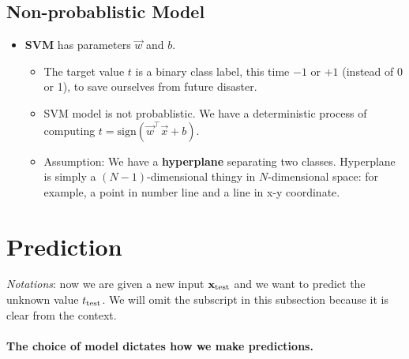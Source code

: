 \documentclass{discussion}
\providecommand{\tightlist}{%
\setlength{\itemsep}{2pt}\setlength{\parskip}{0pt}}
\begin{document}
\subsection{Non-probablistic Model}

\begin{itemize}
\tightlist
\item
  \textbf{SVM} has parameters \(\vec{w}\) and \(b\).

  \begin{itemize}
  \tightlist
  \item
    The target value \(t\) is a binary class label, this time \(-1\) or
    \(+1\) (instead of 0 or 1), to save ourselves from future
    disaster.
  \item
    SVM model is not probablistic. We have a deterministic process of
    computing \(t = \mathrm{sign}(\vec{w}^\top \vec{x} + b)\).
  \item
    Assumption: We have a \textbf{hyperplane} separating two classes. Hyperplane is simply a \((N-1)\)-dimensional thingy in \(N\)-dimensional space: for example, a point in number line and a line in x-y coordinate.
  \end{itemize}
\end{itemize}



\section{Prediction}\label{prediction}

\emph{Notations}: now we are given a new input \(\mathbf{x}_{\mathrm{test}}\) and we want to
predict the unknown value \(t_{\mathrm{test}}\). We will omit the subscript in this subsection because it is clear from the context.

\paragraph{The choice of model dictates how we make
predictions.}\label{the-choice-of-model-dictates-how-we-make-predictions.}
\end{document}
